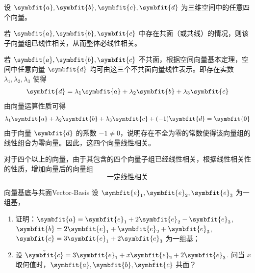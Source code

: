 \begin{myproof}
    设 $\symbfit{a}, \symbfit{b}, \symbfit{c}, \symbfit{d}$ 为三维空间中的任意四个向量。

    若 $\symbfit{a}, \symbfit{b}, \symbfit{c}$ 中存在共面（或共线）的情况，则该子向量组已线性相关，从而整体必线性相关。

    若 $\symbfit{a}, \symbfit{b}, \symbfit{c}$ 不共面，根据空间向量基本定理，空间中任意向量 $\symbfit{d}$ 均可由这三个不共面向量线性表示。即存在实数 $\lambda_1, \lambda_2, \lambda_3$ 使得
    \begin{equation}
        \symbfit{d} = \lambda_1\symbfit{a} + \lambda_2\symbfit{b} + \lambda_3\symbfit{c}
    \end{equation}
    由向量运算性质可得
    \begin{equation}
        \lambda_1\symbfit{a} + \lambda_2\symbfit{b} + \lambda_3\symbfit{c} + (-1)\symbfit{d} = \symbfit{0}
    \end{equation}
    由于向量 $\symbfit{d}$ 的系数 $-1 \neq 0$，说明存在不全为零的常数使得该向量组的线性组合为零向量。因此，这四个向量线性相关。

    对于四个以上的向量，由于其包含的四个向量子组已经线性相关，根据线性相关性的性质，增加向量后的向量组
    \begin{equation}
        \boxed{\text{一定线性相关}}
    \end{equation}
\end{myproof}


\begin{problem}{向量基底与共面}{Vector-Basis}
    设 $\symbfit{e}_1, \symbfit{e}_2, \symbfit{e}_3$ 为一组基，
    \begin{enumerate}
        \item 证明：$\symbfit{a} = \symbfit{e}_1 + 2\symbfit{e}_2 - \symbfit{e}_3$, $\symbfit{b} = 2\symbfit{e}_1 + \symbfit{e}_2 + \symbfit{e}_3$, $\symbfit{c} = 3\symbfit{e}_1 + 2\symbfit{e}_3$ 为一组基；
        \item 设 $\tilde{\symbfit{c}} = 3\symbfit{e}_1 + x\symbfit{e}_2 + 2\symbfit{e}_3$. 问当 $x$ 取何值时，$\symbfit{a}, \symbfit{b}, \tilde{\symbfit{c}}$ 共面？
    \end{enumerate}
\end{problem}

